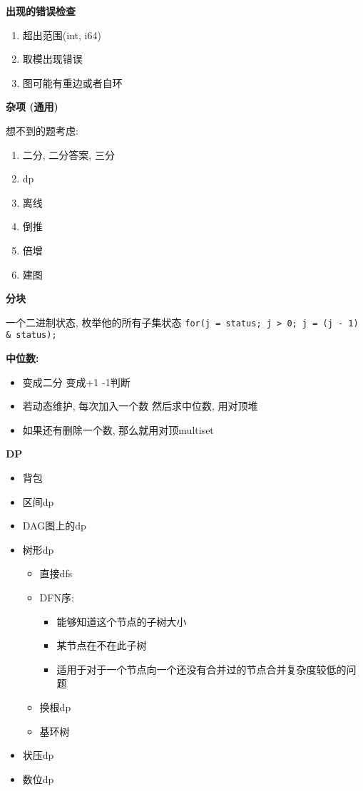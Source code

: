 \textbf{出现的错误检查}

\begin{enumerate}
    \item 超出范围(int, i64)
    \item 取模出现错误
    \item 图可能有重边或者自环
\end{enumerate}

\textbf{杂项 (通用)}

想不到的题考虑: 

\begin{enumerate}
    \item 二分, 二分答案, 三分
    \item dp
    \item 离线
    \item 倒推
    \item 倍增
    \item 建图
\end{enumerate}

\textbf{分块}

一个二进制状态, 枚举他的所有子集状态  \texttt{for(j = status; j > 0; j = (j - 1) \& status);}

\textbf{中位数:}

\begin{itemize}
    \item 变成二分 变成+1 -1判断
    \item 若动态维护, 每次加入一个数 然后求中位数, 用对顶堆
    \item 如果还有删除一个数, 那么就用对顶multiset
\end{itemize}

\textbf{DP}

\begin{itemize}
    \item 背包
    \item 区间dp
    \item DAG图上的dp
    \item 树形dp
    \begin{itemize}
        \item 直接dfs
        \item DFN序: 
        \begin{itemize}
            \item 能够知道这个节点的子树大小
            \item 某节点在不在此子树
            \item 适用于对于一个节点向一个还没有合并过的节点合并复杂度较低的问题
        \end{itemize}
        \item 换根dp
        \item 基环树
    \end{itemize}
    \item 状压dp
    \item 数位dp
\end{itemize}

